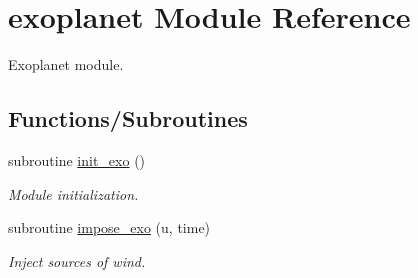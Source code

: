 \hypertarget{namespaceexoplanet}{}\section{exoplanet Module Reference}
\label{namespaceexoplanet}


Exoplanet module.  


\subsection*{Functions/\+Subroutines}
\begin{DoxyCompactItemize}
\item 
subroutine \hyperlink{namespaceexoplanet_a5d1ffcb76d92b3a92a75e492a7376bce}{init\+\_\+exo} ()
\begin{DoxyCompactList}\small\item\em Module initialization. \end{DoxyCompactList}\item 
subroutine \hyperlink{namespaceexoplanet_a025d8839492b18a794c76b5018f43f91}{impose\+\_\+exo} (u, time)
\begin{DoxyCompactList}\small\item\em Inject sources of wind. \end{DoxyCompactList}\end{DoxyCompactItemize}
